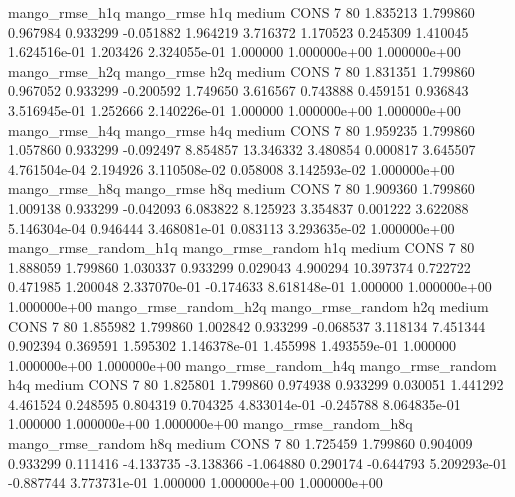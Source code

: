        mango_rmse_h1q        mango_rmse                  h1q     medium     CONS                 7 80  1.835213       1.799860 0.967984       0.933299   -0.051882      1.964219      3.716372     1.170523       0.245309  1.410045 1.624516e-01     1.203426   2.324055e-01            1.000000    1.000000e+00        1.000000e+00
       mango_rmse_h2q        mango_rmse                  h2q     medium     CONS                 7 80  1.831351       1.799860 0.967052       0.933299   -0.200592      1.749650      3.616567     0.743888       0.459151  0.936843 3.516945e-01     1.252666   2.140226e-01            1.000000    1.000000e+00        1.000000e+00
       mango_rmse_h4q        mango_rmse                  h4q     medium     CONS                 7 80  1.959235       1.799860 1.057860       0.933299   -0.092497      8.854857     13.346332     3.480854       0.000817  3.645507 4.761504e-04     2.194926   3.110508e-02            0.058008    3.142593e-02        1.000000e+00
       mango_rmse_h8q        mango_rmse                  h8q     medium     CONS                 7 80  1.909360       1.799860 1.009138       0.933299   -0.042093      6.083822      8.125923     3.354837       0.001222  3.622088 5.146304e-04     0.946444   3.468081e-01            0.083113    3.293635e-02        1.000000e+00
mango_rmse_random_h1q mango_rmse_random                  h1q     medium     CONS                 7 80  1.888059       1.799860 1.030337       0.933299    0.029043      4.900294     10.397374     0.722722       0.471985  1.200048 2.337070e-01    -0.174633   8.618148e-01            1.000000    1.000000e+00        1.000000e+00
mango_rmse_random_h2q mango_rmse_random                  h2q     medium     CONS                 7 80  1.855982       1.799860 1.002842       0.933299   -0.068537      3.118134      7.451344     0.902394       0.369591  1.595302 1.146378e-01     1.455998   1.493559e-01            1.000000    1.000000e+00        1.000000e+00
mango_rmse_random_h4q mango_rmse_random                  h4q     medium     CONS                 7 80  1.825801       1.799860 0.974938       0.933299    0.030051      1.441292      4.461524     0.248595       0.804319  0.704325 4.833014e-01    -0.245788   8.064835e-01            1.000000    1.000000e+00        1.000000e+00
mango_rmse_random_h8q mango_rmse_random                  h8q     medium     CONS                 7 80  1.725459       1.799860 0.904009       0.933299    0.111416     -4.133735     -3.138366    -1.064880       0.290174 -0.644793 5.209293e-01    -0.887744   3.773731e-01            1.000000    1.000000e+00        1.000000e+00
